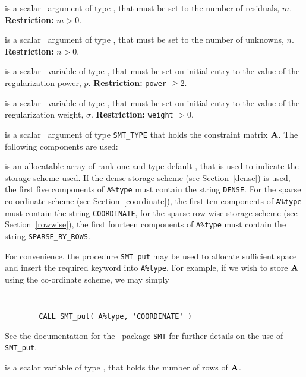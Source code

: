 \documentclass{galahad}
\begin{document}
\begin{description}

 is a scalar \intentin\ argument of type \integer, that must be
set to the number of residuals, $m$. {\bf Restriction: } $m  >  0$.

 is a scalar \intentin\ argument of type \integer, that must be
set to the number of unknowns, $n$. {\bf Restriction: } $n  >  0$.

 is a scalar \intentin\ variable of type \realdp,
that must be set on initial entry
to the value of the regularization power, $p$.
{\bf Restriction: } {\tt power} $\geq 2$.

 is a scalar \intentin\ variable of type \realdp,
that must be set on initial entry
to the value of the regularization weight, $\sigma$.
{\bf Restriction: } {\tt weight} $> 0$.

 is a scalar \intentin\ argument of type {\tt SMT\_TYPE}
that holds the constraint matrix ${\mathbf{A}}$. The following components are used:

\begin{description}

 is an allocatable array of rank one and type default
\character, that
is used to indicate the storage scheme used. If the dense storage scheme
(see Section~\ref{dense}) is used,
the first five components of {\tt A\%type} must contain the
string {\tt DENSE}.
For the sparse co-ordinate scheme (see Section~\ref{coordinate}),
the first ten components of {\tt A\%type} must contain the
string {\tt COORDINATE},
for the sparse row-wise storage scheme (see Section~\ref{rowwise}),
the first fourteen components of {\tt A\%type} must contain the
string {\tt SPARSE\_BY\_ROWS}.

For convenience, the procedure {\tt SMT\_put}
may be used to allocate sufficient space and insert the required keyword
into {\tt A\%type}.
For example, if we wish to store ${\mathbf{A}}$ using the co-ordinate scheme,
we may simply
{\tt
\begin{verbatim}
        CALL SMT_put( A%type, 'COORDINATE' )
\end{verbatim}
}
\noindent
See the documentation for the \galahad\ package {\tt SMT}
for further details on the use of {\tt SMT\_put}.

 is a scalar variable of type \integer, that
holds the number of rows of ${\mathbf{A}}$.


\end{description}
\end{description}
\end{document}
